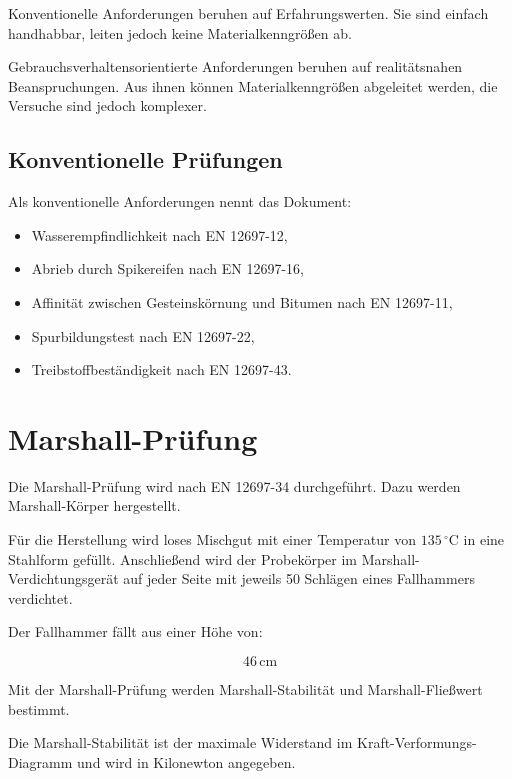\documentclass[
  12pt,
  a4paper,
  oneside
]{scrreprt}
\begin{document}
Konventionelle Anforderungen beruhen auf Erfahrungswerten. Sie sind
einfach handhabbar, leiten jedoch keine Materialkenngrößen ab.


Gebrauchsverhaltensorientierte Anforderungen beruhen auf
realitätsnahen Beanspruchungen. Aus ihnen können Materialkenngrößen
abgeleitet werden, die Versuche sind jedoch komplexer.


\subsection{Konventionelle Prüfungen}

Als konventionelle Anforderungen nennt das Dokument:

\begin{itemize}
  \item Wasserempfindlichkeit nach EN 12697-12,
  \item Abrieb durch Spikereifen nach EN 12697-16,
  \item Affinität zwischen Gesteinskörnung und Bitumen nach
  EN 12697-11,
  \item Spurbildungstest nach EN 12697-22,
  \item Treibstoffbeständigkeit nach EN 12697-43.
\end{itemize}



\section{Marshall-Prüfung}

Die Marshall-Prüfung wird nach EN 12697-34 durchgeführt. Dazu werden
Marshall-Körper hergestellt.


Für die Herstellung wird loses Mischgut mit einer Temperatur von
$135\,^\circ\mathrm{C}$ in eine Stahlform gefüllt. Anschließend wird
der Probekörper im Marshall-Verdichtungsgerät auf jeder Seite mit
jeweils 50 Schlägen eines Fallhammers verdichtet.


Der Fallhammer fällt aus einer Höhe von:

\begin{equation}
  46\,\mathrm{cm}
\end{equation}



Mit der Marshall-Prüfung werden Marshall-Stabilität und Marshall-Fließwert
bestimmt.


Die Marshall-Stabilität ist der maximale Widerstand im
Kraft-Verformungs-Diagramm und wird in Kilonewton angegeben.
\end{document}
